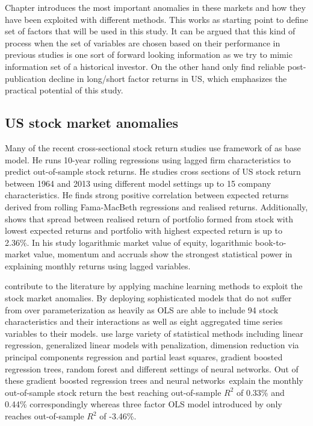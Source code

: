 \documentclass[12pt]{article}
\begin{document}
Chapter introduces the most important anomalies in these markets and how they have been exploited with different methods. This works as starting point to define set of factors that will be used in this study. It can be argued that this kind of process when the set of variables are chosen based on their performance in previous studies is one sort of forward looking information as we try to mimic information set of a historical investor. On the other hand \citet{JACOBS2020213} only find reliable post-publication decline in long/short factor returns in US, which emphasizes the practical potential of this study. \par

\subsection{US stock market anomalies}\label{USStockMarketAnomalies}

Many of the recent cross-sectional stock return studies use framework of \citet{Lewellen2015} as base model. He runs 10-year rolling \citet{FamaMacBeth1973} regressions using lagged firm characteristics to predict out-of-sample stock returns. He studies cross sections of US stock return between 1964 and 2013 using different model settings up to 15 company characteristics. He finds strong positive correlation between expected returns derived from rolling Fama-MacBeth regressions and realised returns. Additionally, \citeauthor{Lewellen2015} shows that spread between realised return of portfolio formed from stock with lowest expected returns and portfolio with highest expected return is up to 2.36\%. In his study logarithmic market value of equity, logarithmic book-to-market value, momentum and accruals show the strongest statistical power in explaining monthly returns using lagged variables. \par

 \citet{guetal} contribute to the literature by applying machine learning methods to exploit the stock market anomalies. By deploying sophisticated models that do not suffer from over parameterization as heavily as OLS \citeauthor{guetal} are able to include 94 stock characteristics and their interactions as well as eight aggregated time series variables to their models. \citeauthor{guetal} use large variety of statistical methods including linear regression, generalized linear models with penalization, dimension reduction via principal components regression and partial least squares, gradient boosted regression trees, random forest and different settings of neural networks. Out of these gradient boosted regression trees and neural networks\footnotemark \ explain the monthly out-of-sample stock return the best reaching out-of-sample $R^{2}$ of 0.33\% and 0.44\% correspondingly whereas three factor OLS model introduced by \citet{Lewellen2015} only reaches out-of-sample $R^{2}$ of -3.46\%. \par
\end{document}
